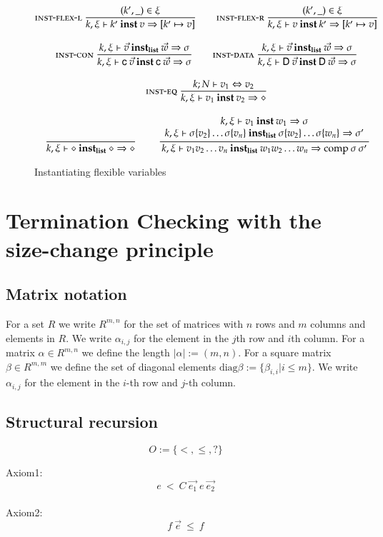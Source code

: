 \begin{figure}[p]
\begin{gather*}
\mbox{\sc inst-flex-l}\ \dfrac{(k',\_) \in \xi}{k,\xi\vdash k'\:\mathbf{inst}\:v\Rightarrow [k' \mapsto v]}
\qquad
\mbox{\sc inst-flex-r}\ \dfrac{(k',\_) \in \xi}{k,\xi\vdash v\:\mathbf{inst}\:k'\Rightarrow [k' \mapsto v]}
\\[2ex]
\mbox{\sc inst-con}\ \dfrac{{k,\xi\vdash\vec{v}\:\mathbf{inst_{list}}\:\vec{w}\Rightarrow \sigma}}{k,\xi\vdash\mathsf{c} \: \vec{v}\:\mathbf{inst}\:\mathsf{c} \: \vec{w}\Rightarrow \sigma
}
\qquad
\mbox{\sc inst-data}\ \dfrac{{k,\xi\vdash\vec{v}\:\mathbf{inst_{list}}\:\vec{w}\Rightarrow \sigma}}{k,\xi\vdash\mathsf{D} \: \vec{v}\:\mathbf{inst}\:\mathsf{D} \: \vec{w}\Rightarrow \sigma
}
\\[2ex]
\mbox{\sc inst-eq}\ \dfrac{k;N\vdash v_1\Leftrightarrow v_2}{k,\xi\vdash v_1\:\mathbf{inst}\:v_2\Rightarrow \diamond
}
\\[2ex]
\ \dfrac{}{k,\xi\vdash\diamond\:\mathbf{inst_{list}}\:\diamond\Rightarrow \diamond}
\qquad
\ \dfrac{\begin{array}[b]{c}k,\xi\vdash v_1\:\mathbf{inst}\:w_1\Rightarrow \sigma\\k,\xi\vdash\sigma\{v_2\} \ldots \sigma\{v_n\}\:\mathbf{inst_{list}}\:\sigma\{w_2\} \ldots \sigma\{w_n\}\Rightarrow \sigma'\end{array}}{k,\xi\vdash v_1 v_2 \ldots v_n\:\mathbf{inst_{list}}\:w_1 w_2 \ldots w_n\Rightarrow \mathrm{comp}\:\sigma\:\sigma'}
\end{gather*}
\caption{Instantiating flexible variables}
\end{figure}

\chapter{Termination Checking with the size-change principle}

\section{Matrix notation}

\newcommand{\diag}{\mathrm{diag}}

For a set $R$ we write $R^{m,n}$ for the set of matrices with $n$ rows and $m$ columns and elements in $R$.
We write $\alpha_{i,j}$ for the element in the $j$th row and $i$th column.
For a matrix $\alpha \in R^{m,n}$ we define the length $|\alpha| := (m,n)$.
For a square matrix $\beta \in R^{m,m}$ we define the set of diagonal elements $\diag \beta := \{ \beta_{i,i} \vert i \leq m\}$.
We write $\alpha_{i,j}$ for the element in the $i$-th row and $j$-th column.


\newcommand{\order}{\mathrm{Order}}
\section{Structural recursion}

\begin{definition}[Order]
\[ O := \{ < , \leq , ? \} \]
\end{definition}
Axiom1:
\[ e \: < \: C \: \vec{e_1} \: e \: \vec{e_2} \]
\\
Axiom2:
\[ f \: \vec{e} \: \leq \: f \] 

